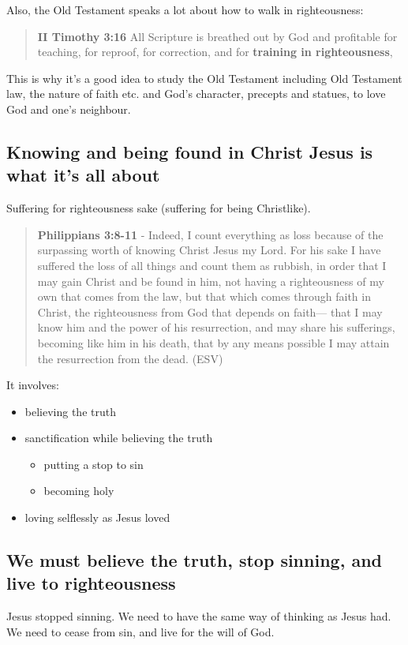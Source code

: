 \documentclass[11pt]{article}
\begin{document}
Also, the Old Testament speaks a lot about how to walk in righteousness:

\begin{quote}
\textbf{II Timothy 3:16} All Scripture is breathed out by God and profitable for teaching, for reproof, for correction, and for \textbf{training in righteousness},
\end{quote}

This is why it's a good idea to study the Old Testament including Old Testament law, the nature of faith etc. and God's character, precepts and statues, to love God and one's neighbour.

\subsection{Knowing and being found in Christ Jesus is what it's all about}
\label{sec:org3eee7b7}
Suffering for righteousness sake (suffering for being Christlike).

\begin{quote}
\textbf{Philippians 3:8-11} - Indeed, I count everything as loss because of the surpassing worth of knowing Christ Jesus my Lord. For his sake I have suffered the loss of all things and count them as rubbish, in order that I may gain Christ and be found in him, not having a righteousness of my own that comes from the law, but that which comes through faith in Christ, the righteousness from God that depends on faith— that I may know him and the power of his resurrection, and may share his sufferings, becoming like him in his death, that by any means possible I may attain the resurrection from the dead. (ESV)
\end{quote}

It involves:
\begin{itemize}
\item believing the truth
\item sanctification while believing the truth
\begin{itemize}
\item putting a stop to sin
\item becoming holy
\end{itemize}
\item loving selflessly as Jesus loved
\end{itemize}

\subsection{We must believe the truth, stop sinning, and live to righteousness}
\label{sec:orga7ec957}
Jesus stopped sinning. We need to have the same way of thinking as Jesus had.
We need to cease from sin, and live for the will of God.
\end{document}
